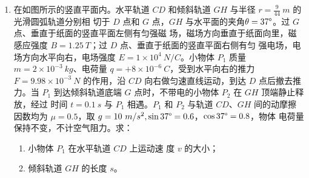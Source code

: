 \begin{enumerate}
\begin{enumerate}
	
\end{enumerate}
\begin{figure}[h!]
	\centering
	
\end{figure}





\item 
{}
在如图所示的竖直平面内。水平轨道 $ CD $ 和倾斜轨道 $ GH $ 与半径 $ r= \frac{9}{44} \ m $ 的光滑圆弧轨道分别相
切于 $ D $ 点和 $ G $ 点，$ GH $ 与水平面的夹角$ \theta =37 \degree  $。过 $ G $ 点、垂直于纸面的竖直平面左侧有匀强磁
场，磁场方向垂直于纸面向里，磁感应强度 $ B=1.25 \ T $；过 $ D $ 点、垂直于纸面的竖直平面右侧有匀
强电场，电场方向水平向右，电场强度 $ E=1 \times 10^{4} \ N /C $。小物体 $ P_{1} $ 质量 $ m=2 \times 10^{-3} \ kg $、电荷量
$ q=+8 \times 10^{-6} \ C $，受到水平向右的推力 $ F=9.98 \times 10^{-3} \ N $ 的作用，沿 $ CD $ 向右做匀速直线运动，到达 $ D $
点后撤去推力。当 $ P_{1} $ 到达倾斜轨道底端 $ G $ 点时，不带电的小物体 $ P_{2} $ 在 $ GH $ 顶端静止释放，经过
时间 $ t=0.1 \ s $ 与 $ P_{1} $ 相遇。$ P_{1} $ 和 $ P_{2} $ 与轨道
$ CD $、$ GH $ 间的动摩擦因数均为 $ \mu=0.5 $，取
$ g=10 \ m/s^{2} , \sin 37 \degree =0.6 $，$ \cos 37 \degree =0.8 $，物体
电荷量保持不变，不计空气阻力。求：
\begin{enumerate}
	\item
小物体 $ P_{1} $ 在水平轨道 $ CD $ 上运动速
度 $ v $ 的大小；

\item 
倾斜轨道 $ GH $ 的长度 $ s $。



\end{enumerate}
\end{enumerate}
